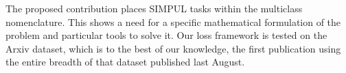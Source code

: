 The proposed contribution places SIMPUL tasks within the multiclass nomenclature. This shows a need for a specific mathematical formulation of the problem and particular tools to solve it. Our loss framework is tested on the Arxiv dataset, which is to the best of our knowledge, the first publication using the entire breadth of that dataset published last August.












